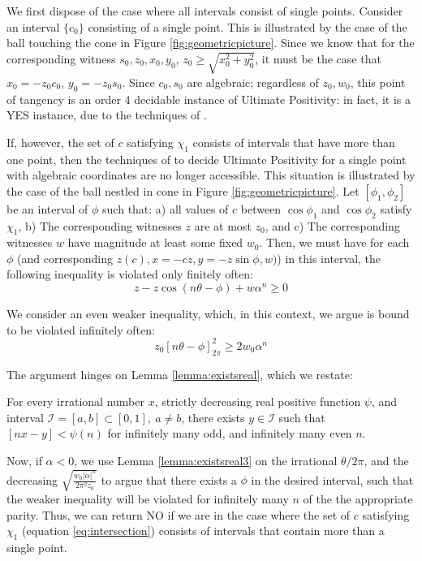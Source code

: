 We first dispose of the case where all intervals consist of single points. Consider an interval $\{c_0\}$ consisting of a single point. This is illustrated by the case of the ball touching the cone in Figure \ref{fig:geometricpicture}. Since we know that for the corresponding witness $s_0, z_0, x_0, y_0$, $z_0 \ge \sqrt{x_0^2 + y_0^2}$, it must be the case that $x_0 = -z_0c_0$, $y_0 = -z_0s_0$. Since $c_0, s_0$ are algebraic; regardless of $z_0, w_0$, this point of tangency is an order 4 decidable instance of Ultimate Positivity: in fact, it is a YES instance, due to the techniques of \cite{ouaknine2014ultimate}.

If, however, the set of $c$ satisfying $\chi_1$ consists of intervals that have more than one point, then the techniques of \cite{ouaknine2014ultimate} to decide Ultimate Positivity for a single point with algebraic coordinates are no longer accessible. This situation is illustrated by the case of the ball nestled in cone in Figure \ref{fig:geometricpicture}. Let $[\phi_1, \phi_2]$ be an interval of $\phi$ such that: a) all values of $c$ between $\cos\phi_1$ and $\cos\phi_2$ satisfy $\chi_1$, b) The corresponding witnesses $z$ are at most $z_0$, and c) The corresponding witnesses $w$ have magnitude at least some fixed $w_0$. Then, we must have for each $\phi$ (and corresponding $z(c), x = -cz, y = -z\sin \phi, w)$) in this interval, the following inequality is violated only finitely often:
\begin{equation}
z - z\cos(n\theta - \phi) + w\alpha^n \ge 0
\end{equation}

We consider an even weaker inequality, which, in this context, we argue is bound to be violated infinitely often:
\begin{equation}
z_0[n\theta - \phi]_{2\pi}^2  \ge 2w_0\alpha^n
\end{equation}

The argument hinges on Lemma \ref{lemma:existsreal}, which we restate:
\begin{lemma}
\label{lemma:existsreal3}
For every irrational number $x$, strictly decreasing real positive function $\psi$, and interval $\mathcal{I} = [a, b] \subset [0, 1], ~ a \ne b$, there exists $y \in \mathcal{I}$ such that $[nx - y] < \psi(n)$ for infinitely many odd, and infinitely many even $n$.
\end{lemma}

Now, if $\alpha < 0$, we use Lemma \ref{lemma:existsreal3} on the irrational $\theta/2\pi$, and the decreasing $\sqrt{\frac{w_0 |\alpha|^n}{2\pi^2z_0}}$ to argue that there exists a $\phi$ in the desired interval, such that the weaker inequality will be violated for infinitely many $n$ of the the appropriate parity. Thus, we can return NO if we are in the case where the set of $c$ satisfying $\chi_1$ (equation \ref{eq:intersection}) consists of intervals that contain more than a single point.

